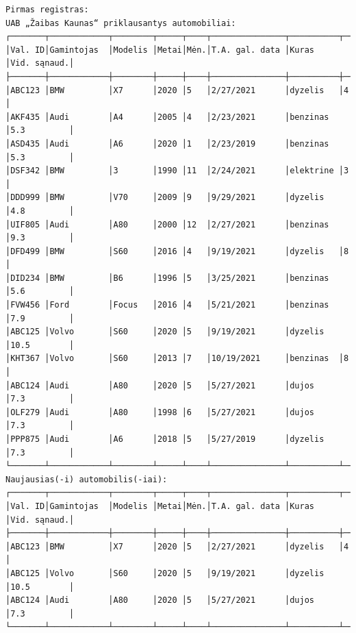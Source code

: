 \documentclass{article}
\begin{document}
\begin{verbatim}
Pirmas registras:
UAB „Žaibas Kaunas“ priklausantys automobiliai:
┌───────┬────────────┬────────┬─────┬────┬───────────────┬──────────┬────────────┐
│Val. ID│Gamintojas  │Modelis │Metai│Mėn.│T.A. gal. data │Kuras     │Vid. sąnaud.│
├───────┼────────────┼────────┼─────┼────┼───────────────┼──────────┼────────────┤
│ABC123 │BMW         │X7      │2020 │5   │2/27/2021      │dyzelis   │4           │
│AKF435 │Audi        │A4      │2005 │4   │2/23/2021      │benzinas  │5.3         │
│ASD435 │Audi        │A6      │2020 │1   │2/23/2019      │benzinas  │5.3         │
│DSF342 │BMW         │3       │1990 │11  │2/24/2021      │elektrine │3           │
│DDD999 │BMW         │V70     │2009 │9   │9/29/2021      │dyzelis   │4.8         │
│UIF805 │Audi        │A80     │2000 │12  │2/27/2021      │benzinas  │9.3         │
│DFD499 │BMW         │S60     │2016 │4   │9/19/2021      │dyzelis   │8           │
│DID234 │BMW         │B6      │1996 │5   │3/25/2021      │benzinas  │5.6         │
│FVW456 │Ford        │Focus   │2016 │4   │5/21/2021      │benzinas  │7.9         │
│ABC125 │Volvo       │S60     │2020 │5   │9/19/2021      │dyzelis   │10.5        │
│KHT367 │Volvo       │S60     │2013 │7   │10/19/2021     │benzinas  │8           │
│ABC124 │Audi        │A80     │2020 │5   │5/27/2021      │dujos     │7.3         │
│OLF279 │Audi        │A80     │1998 │6   │5/27/2021      │dujos     │7.3         │
│PPP875 │Audi        │A6      │2018 │5   │5/27/2019      │dyzelis   │7.3         │
└───────┴────────────┴────────┴─────┴────┴───────────────┴──────────┴────────────┘
Naujausias(-i) automobilis(-iai):
┌───────┬────────────┬────────┬─────┬────┬───────────────┬──────────┬────────────┐
│Val. ID│Gamintojas  │Modelis │Metai│Mėn.│T.A. gal. data │Kuras     │Vid. sąnaud.│
├───────┼────────────┼────────┼─────┼────┼───────────────┼──────────┼────────────┤
│ABC123 │BMW         │X7      │2020 │5   │2/27/2021      │dyzelis   │4           │
│ABC125 │Volvo       │S60     │2020 │5   │9/19/2021      │dyzelis   │10.5        │
│ABC124 │Audi        │A80     │2020 │5   │5/27/2021      │dujos     │7.3         │
└───────┴────────────┴────────┴─────┴────┴───────────────┴──────────┴────────────┘


\end{verbatim}
\end{document}

